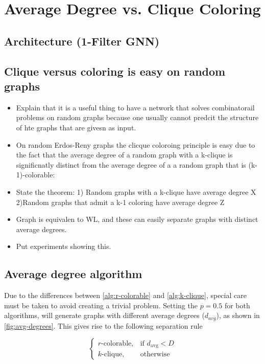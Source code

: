 \section{Average Degree vs. Clique Coloring}
\subsection{Architecture (1-Filter GNN)}



\subsection{Clique versus coloring is easy on random graphs}

\begin{itemize}
\item Explain that it is a useful thing to have a network that solves combinatorail problems on random graphs because one usually cannot predcit the structure of hte graphs that are givesn as input. 
\item On random Erdos-Reny graphs the clicque coloroing principle is easy due to the fact that 
the average degree of a random graph with a k-clique is significnatly distinct from the average degree of a a random graph that is (k-1)-colorable: 
\item State the theorem: 1) Random graphs with a k-clique have average degree X
2)Random graphs that admit a k-1 coloring have average degree Z
\item Graph is equivalen to WL, and these can easily separate graphs with distinct average degrees. 
\item Put experiments showing this. 
\end{itemize}


\subsection{Average degree algorithm}
Due to the differences between \cref{alg:r-colorable} and \cref{alg:k-clique}, special care must be taken to avoid creating a trivial problem. Setting the $p = 0.5$ for both algorithms, will generate graphs with different average degrees ($d_{avg}$), as shown in \cref{fig:avg-degrees}. This gives rise to the following separation rule

\begin{equation}
\begin{cases}
r\text{-colorable}, & \text{if } d_{\text{avg}} < D \\
k\text{-clique}, & \text{otherwise}
\end{cases}
\end{equation}

